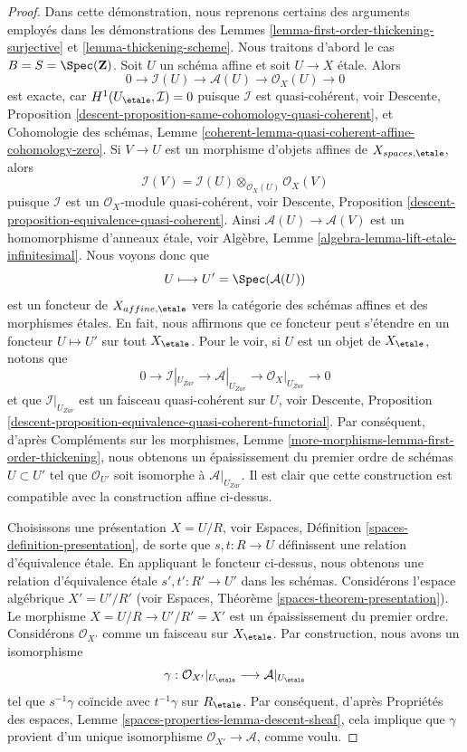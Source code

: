 \begin{proof}
Dans cette démonstration, nous reprenons certains des arguments employés dans les
démonstrations des
Lemmes \ref{lemma-first-order-thickening-surjective} et
\ref{lemma-thickening-scheme}.
Nous traitons d'abord le cas $B = S = \Spec(\mathbf{Z})$.
Soit $U$ un schéma affine et soit $U \to X$ étale.
Alors
$$
0 \to \mathcal{I}(U) \to \mathcal{A}(U) \to \mathcal{O}_X(U) \to 0
$$
est exacte, car $H^1(U_\etale, \mathcal{I}) = 0$ puisque
$\mathcal{I}$ est quasi-cohérent, voir
Descente, Proposition \ref{descent-proposition-same-cohomology-quasi-coherent},
et Cohomologie des schémas, Lemme
\ref{coherent-lemma-quasi-coherent-affine-cohomology-zero}.
Si $V \to U$ est un morphisme d'objets affines de $X_{spaces, \etale}$,
alors
$$
\mathcal{I}(V) = \mathcal{I}(U) \otimes_{\mathcal{O}_X(U)} \mathcal{O}_X(V)
$$
puisque $\mathcal{I}$ est un $\mathcal{O}_X$-module quasi-cohérent, voir
Descente, Proposition \ref{descent-proposition-equivalence-quasi-coherent}.
Ainsi $\mathcal{A}(U) \to \mathcal{A}(V)$ est un homomorphisme d'anneaux
étale, voir
Algèbre, Lemme \ref{algebra-lemma-lift-etale-infinitesimal}.
Nous voyons donc que
$$
U \longmapsto U' = \Spec(\mathcal{A}(U))
$$
est un foncteur de $X_{affine, \etale}$ vers la catégorie des schémas
affines et des morphismes étales. En fait, nous affirmons que ce foncteur peut
s'étendre en un foncteur $U \mapsto U'$ sur tout $X_\etale$.
Pour le voir, si $U$ est un objet de $X_\etale$, notons que
$$
0 \to \mathcal{I}|_{U_{Zar}} \to \mathcal{A}|_{U_{Zar}} \to
\mathcal{O}_X|_{U_{Zar}} \to 0
$$
et que $\mathcal{I}|_{U_{Zar}}$ est un faisceau quasi-cohérent sur $U$, voir
Descente,
Proposition \ref{descent-proposition-equivalence-quasi-coherent-functorial}.
Par conséquent, d'après
Compléments sur les morphismes, Lemme \ref{more-morphisms-lemma-first-order-thickening},
nous obtenons un épaississement du premier ordre de schémas $U \subset U'$ tel que
$\mathcal{O}_{U'}$ soit isomorphe à $\mathcal{A}|_{U_{Zar}}$. Il est clair que
cette construction est compatible avec la construction affine ci-dessus.

\medskip\noindent
Choisissons une présentation $X = U/R$, voir
Espaces, Définition \ref{spaces-definition-presentation},
de sorte que $s, t : R \to U$ définissent une relation d'équivalence étale.
En appliquant le foncteur ci-dessus, nous obtenons une relation d'équivalence
étale $s', t' : R' \to U'$ dans les schémas. Considérons l'espace algébrique
$X' = U'/R'$ (voir
Espaces, Théorème \ref{spaces-theorem-presentation}).
Le morphisme $X = U/R \to U'/R' = X'$ est un épaississement du premier ordre.
Considérons $\mathcal{O}_{X'}$ comme un faisceau sur $X_\etale$.
Par construction, nous avons un isomorphisme
$$
\gamma :
\mathcal{O}_{X'}|_{U_\etale}
\longrightarrow
\mathcal{A}|_{U_\etale}
$$
tel que $s^{-1}\gamma$ coïncide avec $t^{-1}\gamma$ sur $R_\etale$.
Par conséquent, d'après
Propriétés des espaces, Lemme \ref{spaces-properties-lemma-descent-sheaf},
cela implique que $\gamma$ provient d'un unique isomorphisme
$\mathcal{O}_{X'} \to \mathcal{A}$, comme voulu.


\end{proof}

